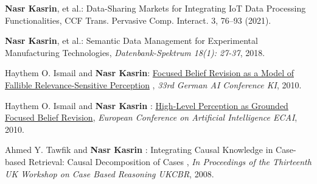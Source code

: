 \documentclass[10pt]{article}
\renewcommand{\section}[1]{\pagebreak[3]%
    \vspace{1.3\baselineskip}%
    \phantomsection\addcontentsline{toc}{section}{#1}%
    \noindent\llap{\scshape\smash{\parbox[t]{\marginparwidth}{\hyphenpenalty=10000\raggedright #1}}}%
    \vspace{-\baselineskip}\par}
\begin{document}
\begin{bibenum}
	
	\item \textbf{Nasr Kasrin}, et al.: Data-Sharing Markets for Integrating IoT Data Processing Functionalities,  CCF Trans. Pervasive Comp. Interact. 3, 76–93 (2021).
	
    \item \textbf{Nasr Kasrin}, et al.: Semantic Data Management for Experimental Manufacturing Technologies, \emph{Datenbank-Spektrum 18(1): 27-37}, 2018. 
	
    \item Haythem O. Ismail and \textbf{Nasr Kasrin}: \href{http://met.guc.edu.eg/Repository/Faculty/Publications/317/KI2010-62.pdf}{Focused Belief Revision as a Model of Fallible Relevance-Sensitive Perception} , \emph{33rd German AI Conference KI}, 2010. 

    \item Haythem O. Ismail and \textbf{Nasr Kasrin} : \href{http://met.guc.edu.eg/Repository/Faculty/Publications/319/ECAI-510.pdf}{High-Level Perception as Grounded Focused Belief Revision}, \emph{European Conference on Artificial Intelligence ECAI}, 2010. 

    \item Ahmed Y. Tawfik and \textbf{Nasr Kasrin} : Integrating Causal Knowledge in Case-based Retrieval: Causal Decomposition of Cases , \emph{In Proceedings of the Thirteenth UK Workshop on Case Based Reasoning UKCBR}, 2008.
\end{bibenum}


%
%
\end{document}
